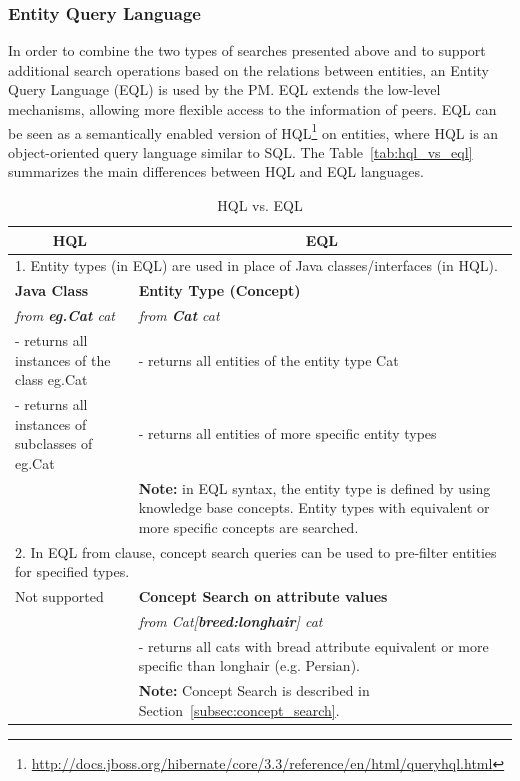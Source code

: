 \subsubsection{Entity Query Language}
\label{subsec:entity_query_language}
In order to combine the two types of searches presented above and to support additional search operations based on the relations between entities, an Entity Query Language (EQL) is used by the PM. EQL extends the low-level mechanisms, allowing more flexible access to the information of peers. EQL can be seen as a semantically enabled version of HQL\footnote{\url{http://docs.jboss.org/hibernate/core/3.3/reference/en/html/queryhql.html}} on entities, where HQL is an object-oriented query language similar to SQL. The Table~\ref{tab:hql_vs_eql} summarizes the main differences between HQL and EQL languages. 
\begin{table}[ht]
\small
\centering
\caption{HQL vs. EQL}
\begin{tabularx}{\linewidth}{|X|X|}
\hline
\multicolumn{1}{|c|}{\textbf{HQL}} & \multicolumn{1}{c|}{\textbf{EQL}} \\ 
\hline

\multicolumn{2}{|p{0.9\linewidth}|}{1. Entity types (in EQL) are used in place of Java classes/interfaces (in HQL).} \\
\hline
\textbf{Java Class} & \textbf{Entity Type (Concept)} \\
\hdashline
\emph{from \textbf{eg.Cat} cat} & \emph{from \textbf{Cat} cat} \\
- returns all instances of the class eg.Cat & - returns all entities of the entity type Cat \\
- returns all instances of subclasses of eg.Cat & - returns all entities of more specific entity types \\
 & \textbf{Note:} in EQL syntax, the entity type is defined by using knowledge base concepts. Entity types with equivalent or more specific concepts are searched. \\
 \hline
 
\multicolumn{2}{|p{0.96\linewidth}|}{2. In EQL from clause, concept search queries can be used to pre-filter entities for specified types.} \\
\hline
Not supported & \textbf{Concept Search on attribute values} \\
\hdashline
 & \emph{from Cat[\textbf{breed:longhair}] cat} \\
 & - returns all cats with bread attribute equivalent or more specific than longhair (e.g. Persian). \\
 & \textbf{Note:} Concept Search is described in Section~\ref{subsec:concept_search}. \\
 \hline


\end{tabularx}
\end{table}
